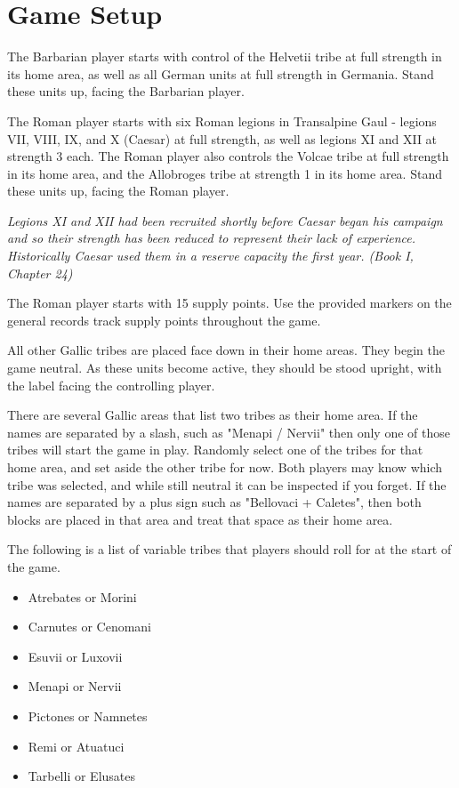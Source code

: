 \section{Game Setup}

The Barbarian player starts with control of the Helvetii tribe at full strength in its home area, as well as all German units at full strength in Germania. Stand these units up, facing the Barbarian player.

The Roman player starts with six Roman legions in Transalpine Gaul - legions VII, VIII, IX, and X (Caesar) at full strength, as well as legions XI and XII at strength 3 each. The Roman player also controls the Volcae tribe at full strength in its home area, and the Allobroges tribe at strength 1 in its home area. Stand these units up, facing the Roman player.

\textit{Legions XI and XII had been recruited shortly before Caesar began his campaign and so their strength has been reduced to represent their lack of experience. Historically Caesar used them in a reserve capacity the first year. (Book I, Chapter 24)}

The Roman player starts with 15 supply points. Use the provided markers on the general records track supply points throughout the game.

All other Gallic tribes are placed face down in their home areas. They begin the game neutral. As these units become active, they should be stood upright, with the label facing the controlling player.

There are several Gallic areas that list two tribes as their home area. If the names are separated by a slash, such as "Menapi / Nervii" then only one of those tribes will start the game in play. Randomly select one of the tribes for that home area, and set aside the other tribe for now. Both players may know which tribe was selected, and while still neutral it can be inspected if you forget. If the names are separated by a plus sign such as "Bellovaci + Caletes", then both blocks are placed in that area and treat that space as their home area.

The following is a list of variable tribes that players should roll for at the start of the game.

\begin{itemize}[nosep]
  \item Atrebates or Morini
  \item Carnutes or Cenomani
  \item Esuvii or Luxovii
  \item Menapi or Nervii
  \item Pictones or Namnetes
  \item Remi or Atuatuci
  \item Tarbelli or Elusates
\end{itemize}